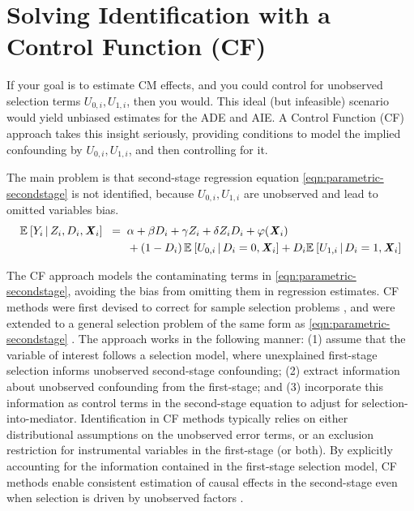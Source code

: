 \section{Solving Identification with a Control Function (CF)}
\label{sec:selectionmodel}
If your goal is to estimate CM effects, and you could control for unobserved selection terms $U_{0,i}, U_{1,i}$, then you would.
This ideal (but infeasible) scenario would yield unbiased estimates for the ADE and AIE.
A Control Function (CF) approach takes this insight seriously, providing conditions to model the implied confounding by $U_{0,i}, U_{1,i}$, and then controlling for it.

The main problem is that second-stage regression equation \eqref{eqn:parametric-secondstage} is not identified, because $U_{0,i},U_{1,i}$ are unobserved and lead to omitted variables bias.
\begin{align}
    \mathbb{E}_{} \left[ Y_i \, \middle\vert \, Z_i, D_i, \boldsymbol{\mathit{X}}_i \right] \;\; =& \;\;
        \alpha
        + \beta D_i
        + \gamma Z_i
        + \delta Z_i D_i
        + \varphi(\boldsymbol{\mathit{X}}_i) \nonumber \\
        \label{eqn:secondstage-reg}
        & \;\; +\left( 1 - D_i \right) \mathbb{E}_{} \left[  U_{0,i}  \, \middle\vert \, D_i = 0, \boldsymbol{\mathit{X}}_i \right]
            + D_i \mathbb{E}_{} \left[  U_{1,i}  \, \middle\vert \, D_i = 1, \boldsymbol{\mathit{X}}_i \right]
        \nonumber
\end{align}

The CF approach models the contaminating terms in \eqref{eqn:parametric-secondstage}, avoiding the bias from omitting them in regression estimates.
CF methods were first devised to correct for sample selection problems \citep{heckman1974shadow}, and were extended to a general selection problem of the same form as \eqref{eqn:parametric-secondstage} \citep{heckman1979sample}.
The approach works in the following manner: (1) assume that the variable of interest follows a selection model, where unexplained first-stage selection informs unobserved second-stage confounding; (2) extract information about unobserved confounding from the first-stage; and (3) incorporate this information as control terms in the second-stage equation to adjust for selection-into-mediator.
Identification in CF methods typically relies on either distributional assumptions on the unobserved error terms, or an exclusion restriction for instrumental variables in the first-stage (or both).
By explicitly accounting for the information contained in the first-stage selection model, CF methods enable consistent estimation of causal effects in the second-stage even when selection is driven by unobserved factors \citep{florens2008identification}.

